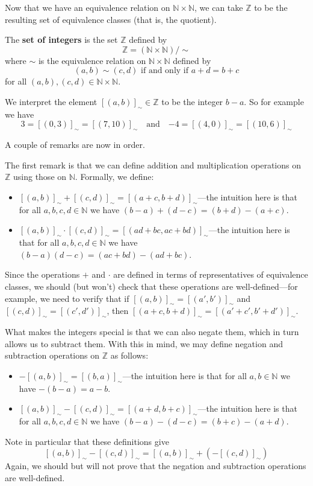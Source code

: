 Now that we have an equivalence relation on $\mathbb{N} \times \mathbb{N}$, we can take $\mathbb{Z}$ to be the resulting set of equivalence classes (that is, the quotient).

\begin{construction}
\label{cnsIntegersFromNaturalNumbers}
The \textbf{set of integers} is the set $\mathbb{Z}$ defined by
\[ \mathbb{Z} = (\mathbb{N} \times \mathbb{N})/{\sim} \]
where $\sim$ is the equivalence relation on $\mathbb{N} \times \mathbb{N}$ defined by
\[ (a,b) \sim (c,d) \text{ if and only if } a+d=b+c \]
for all $(a,b),(c,d) \in \mathbb{N} \times \mathbb{N}$.
\end{construction}

We interpret the element $[(a,b)]_{\sim} \in \mathbb{Z}$ to be the integer $b-a$. So for example we have
\[ 3 = [(0,3)]_{\sim} = [(7,10)]_{\sim} \quad \text{and} \quad {-4} = [(4,0)]_{\sim} = [(10,6)]_{\sim} \]

A couple of remarks are now in order.

The first remark is that we can define addition and multiplication operations on $\mathbb{Z}$ using those on $\mathbb{N}$. Formally, we define:
\begin{itemize}
\item $[(a,b)]_{\sim} + [(c,d)]_{\sim} = [(a+c, b+d)]_{\sim}$---the intuition here is that for all $a,b,c,d \in \mathbb{N}$ we have $(b-a) + (d-c) = (b+d) - (a+c)$.
\item $[(a,b)]_{\sim} \cdot [(c,d)]_{\sim} = [(ad+bc, ac+bd)]_{\sim}$---the intuition here is that for all $a,b,c,d \in \mathbb{N}$ we have $(b-a)(d-c) = (ac+bd) - (ad+bc)$.
\end{itemize}
Since the operations $+$ and $\cdot$ are defined in terms of representatives of equivalence classes, we should (but won't) check that these operations are well-defined---for example, we need to verify that if $[(a,b)]_{\sim} = [(a',b')]_{\sim}$ and $[(c,d)]_{\sim} = [(c',d')]_{\sim}$, then $[(a+c,b+d)]_{\sim} = [(a'+c',b'+d')]_{\sim}$.

What makes the integers special is that we can also negate them, which in turn allows us to subtract them. With this in mind, we may define negation and subtraction operations on $\mathbb{Z}$ as follows:
\begin{itemize}
\item $-[(a,b)]_{\sim} = [(b,a)]_{\sim}$---the intuition here is that for all $a,b \in \mathbb{N}$ we have $-(b-a) = a-b$.
\item $[(a,b)]_{\sim} - [(c,d)]_{\sim} = [(a+d,b+c)]_{\sim}$---the intuition here is that for all $a,b,c,d \in \mathbb{N}$ we have $(b-a) - (d-c) = (b+c) - (a+d)$.
\end{itemize}
Note in particular that these definitions give
\[ [(a,b)]_{\sim} - [(c,d)]_{\sim} = [(a,b)]_{\sim} + (-[(c,d)]_{\sim}) \]
Again, we should but will not prove that the negation and subtraction operations are well-defined.


